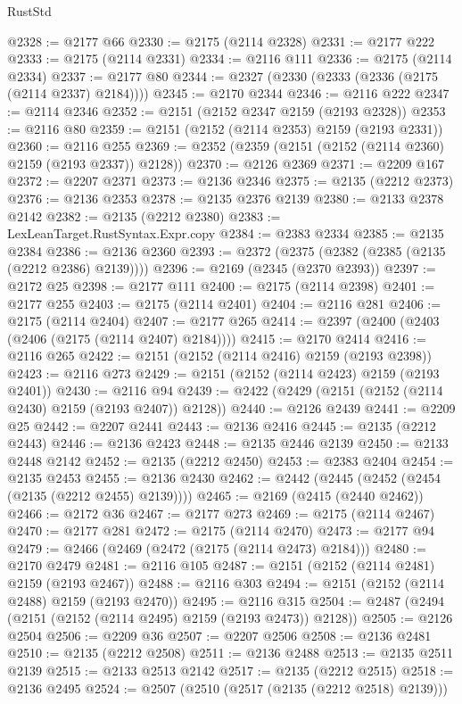 \begin{lexlean}{RustStd}
\begin{coremodule}
{\begin{coremodule}
{{{{{{{{{{{{{{{{@2328 := @2177 @66
@2330 := @2175 (@2114 @2328)
@2331 := @2177 @222
@2333 := @2175 (@2114 @2331)
@2334 := @2116 @111
@2336 := @2175 (@2114 @2334)
@2337 := @2177 @80
@2344 := @2327 (@2330 (@2333 (@2336 (@2175 (@2114 @2337) @2184))))
@2345 := @2170 @2344
@2346 := @2116 @222
@2347 := @2114 @2346
@2352 := @2151 (@2152 @2347 @2159 (@2193 @2328))
@2353 := @2116 @80
@2359 := @2151 (@2152 (@2114 @2353) @2159 (@2193 @2331))
@2360 := @2116 @255
@2369 := @2352 (@2359 (@2151 (@2152 (@2114 @2360) @2159 (@2193 @2337)) @2128))
@2370 := @2126 @2369
@2371 := @2209 @167
@2372 := @2207 @2371
@2373 := @2136 @2346
@2375 := @2135 (@2212 @2373)
@2376 := @2136 @2353
@2378 := @2135 @2376 @2139
@2380 := @2133 @2378 @2142
@2382 := @2135 (@2212 @2380)
@2383 := LexLeanTarget.RustSyntax.Expr.copy
@2384 := @2383 @2334
@2385 := @2135 @2384
@2386 := @2136 @2360
@2393 := @2372 (@2375 (@2382 (@2385 (@2135 (@2212 @2386) @2139))))
@2396 := @2169 (@2345 (@2370 @2393))
@2397 := @2172 @25
@2398 := @2177 @111
@2400 := @2175 (@2114 @2398)
@2401 := @2177 @255
@2403 := @2175 (@2114 @2401)
@2404 := @2116 @281
@2406 := @2175 (@2114 @2404)
@2407 := @2177 @265
@2414 := @2397 (@2400 (@2403 (@2406 (@2175 (@2114 @2407) @2184))))
@2415 := @2170 @2414
@2416 := @2116 @265
@2422 := @2151 (@2152 (@2114 @2416) @2159 (@2193 @2398))
@2423 := @2116 @273
@2429 := @2151 (@2152 (@2114 @2423) @2159 (@2193 @2401))
@2430 := @2116 @94
@2439 := @2422 (@2429 (@2151 (@2152 (@2114 @2430) @2159 (@2193 @2407)) @2128))
@2440 := @2126 @2439
@2441 := @2209 @25
@2442 := @2207 @2441
@2443 := @2136 @2416
@2445 := @2135 (@2212 @2443)
@2446 := @2136 @2423
@2448 := @2135 @2446 @2139
@2450 := @2133 @2448 @2142
@2452 := @2135 (@2212 @2450)
@2453 := @2383 @2404
@2454 := @2135 @2453
@2455 := @2136 @2430
@2462 := @2442 (@2445 (@2452 (@2454 (@2135 (@2212 @2455) @2139))))
@2465 := @2169 (@2415 (@2440 @2462))
@2466 := @2172 @36
@2467 := @2177 @273
@2469 := @2175 (@2114 @2467)
@2470 := @2177 @281
@2472 := @2175 (@2114 @2470)
@2473 := @2177 @94
@2479 := @2466 (@2469 (@2472 (@2175 (@2114 @2473) @2184)))
@2480 := @2170 @2479
@2481 := @2116 @105
@2487 := @2151 (@2152 (@2114 @2481) @2159 (@2193 @2467))
@2488 := @2116 @303
@2494 := @2151 (@2152 (@2114 @2488) @2159 (@2193 @2470))
@2495 := @2116 @315
@2504 := @2487 (@2494 (@2151 (@2152 (@2114 @2495) @2159 (@2193 @2473)) @2128))
@2505 := @2126 @2504
@2506 := @2209 @36
@2507 := @2207 @2506
@2508 := @2136 @2481
@2510 := @2135 (@2212 @2508)
@2511 := @2136 @2488
@2513 := @2135 @2511 @2139
@2515 := @2133 @2513 @2142
@2517 := @2135 (@2212 @2515)
@2518 := @2136 @2495
@2524 := @2507 (@2510 (@2517 (@2135 (@2212 @2518) @2139)))
}}}}}}}}}}}}}}}}
\end{coremodule}}
\end{coremodule}
\end{lexlean}
